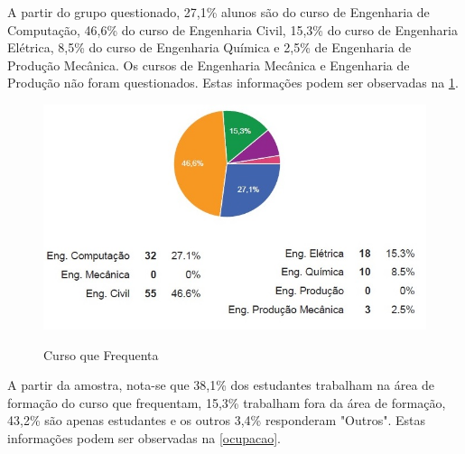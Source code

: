 \documentclass[
	article,			%
	11pt,				%
	oneside,			%
	a4paper,			%
	english,			%
	brazil,				%
	sumario=tradicional
	]{abntex2}
\begin{document}
A partir do grupo questionado, 27,1\% alunos são do curso de Engenharia de Computação, 46,6\% do curso de Engenharia Civil, 15,3\% do curso de Engenharia Elétrica, 8,5\% do curso de Engenharia Química e 2,5\% de Engenharia de Produção Mecânica. Os cursos de Engenharia Mecânica e Engenharia de Produção não foram questionados. Estas informações podem ser observadas na \figurename{ \ref{curso}}.

\begin{figure}[h]  
	\begin{center} 
		\begin{center}
			\changecaptionwidth 
			\captionwidth{13.5cm} %
			\caption{\label{curso} Curso que Frequenta}
			{\includegraphics[scale=0.8]{imagens/curso}}
		\end{center}
	\end{center}
\end{figure}
\FloatBarrier


A partir da amostra, nota-se que 38,1\% dos estudantes trabalham na área de formação do curso que frequentam, 15,3\% trabalham fora da área de formação, 43,2\% são apenas estudantes e os outros 3,4\% responderam "Outros". Estas informações podem ser observadas na \figurename{ \ref{ocupacao}}.
\end{document}

